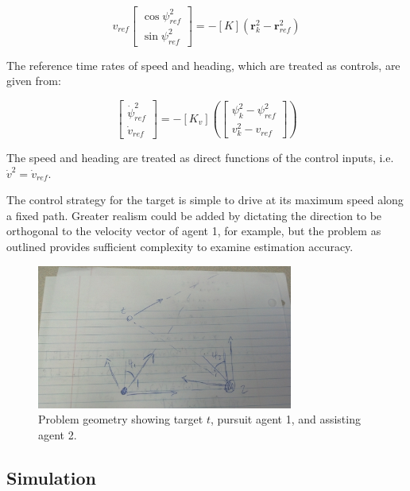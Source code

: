 \documentclass{aiaa-tc}
\newcommand{\B}[1]{\textbf{#1}} %
\begin{document}
\begin{equation}
v_{ref}\begin{bmatrix}
\cos{\psi^2_{ref}}\\
\sin{\psi^2_{ref}}
\end{bmatrix} = -[K](\B{r}^2_k - \B{r}^2_{ref})
\end{equation}

The reference time rates of speed and heading, which are treated as controls,  are given from:

\begin{equation}
\begin{bmatrix}
\dot{\psi}^2_{ref}\\
\dot{v}_{ref}
\end{bmatrix} = 
-[K_v]\left(\begin{bmatrix}
\psi^2_k - \psi^2_{ref}\\
v^2_k - v_{ref}
\end{bmatrix}\right)
\end{equation}

The speed and heading are treated as direct functions of the control inputs, i.e. $\dot{v}^2 = \dot{v}_{ref}$.

The control strategy for the target is simple to drive at its maximum speed along a fixed path. Greater realism could be added by dictating the direction to be orthogonal to the velocity vector of agent 1, for example, but the problem as outlined provides sufficient complexity to examine estimation accuracy.

\begin{figure}
\centering
\includegraphics[trim = 250mm 50mm 175mm 50mm,clip = true,width=0.75\textwidth]{target_chase.jpg}
\caption{ Problem geometry showing target $t$, pursuit agent 1, and assisting agent 2.}
\label{fig:target_chase}
\end{figure}

\subsection{Simulation}
\end{document}
